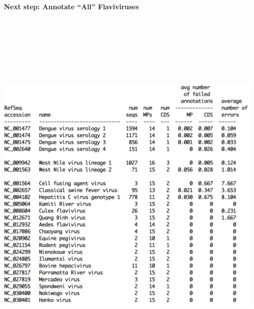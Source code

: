 \documentclass[landscape]{slides}
\begin{document}
\begin{slide}
\begin{center}
\textbf{Next step: Annotate ``All'' Flaviviruses}

\includegraphics[height=7.5in]{figs/flavi-virus-table}

\vfill
\end{center}
\end{slide}
\end{document}
